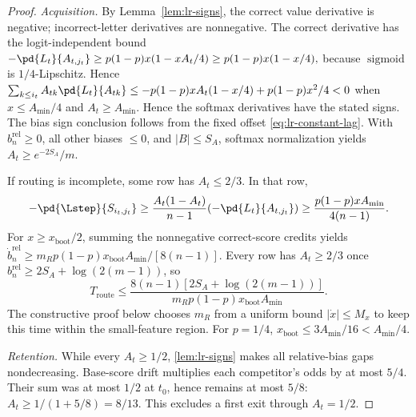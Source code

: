 \begin{proof}
\emph{Acquisition.} By Lemma~\ref{lem:lr-signs}, the correct value derivative is negative;
incorrect-letter derivatives are nonnegative.  The correct derivative has the logit-independent bound
 $-\pd{L_t}{A_{t,j_t}}\ge p(1-p) x(1-xA_t/4)\ge p(1-p) x(1-x/4),$ 
because $\operatorname{sigmoid}$ is $1/4$-Lipschitz. Hence
 $\sum_{k\le i_t}A_{tk}\pd{L_t}{A_{tk}}\le-p(1-p) x A_t(1-x/4)+p(1-p) x^2/4<0$ 
when $x\le A_{\min}/4$ and $A_t\ge A_{\min}$.  Hence the softmax derivatives have the stated signs.
The bias sign conclusion follows from the fixed offset
\eqref{eq:lr-constant-lag}.
With $b_n^{\mathrm{rel}}\ge0$, all other biases $\le0$,
and $|B|\le S_A$, softmax normalization yields
$A_t\ge e^{-2S_A}/m$.

If routing is incomplete, some row has $A_t\le2/3$. In that row,
\[
 -\pd{\Lstep}{S_{i_t,j_t}}
 \ge\frac{A_t(1-A_t)}{n-1}(-\pd{L_t}{A_{t,j_t}})
 \ge\frac{p(1-p)xA_{\min}}{4(n-1)}.
\]
For $x\ge x_{\mathrm{boot}}/2$, summing the nonnegative correct-score
credits yields $\dot b_n^{\mathrm{rel}}\ge
m_Rp(1-p)x_{\mathrm{boot}}A_{\min}/[8(n-1)]$.
Every row has $A_t\ge2/3$ once
$b_n^{\mathrm{rel}}\ge2S_A+\log(2(m-1))$, so
\[
 T_{\mathrm{route}}\le
 \frac{8(n-1)[2S_A+\log(2(m-1))]}{m_Rp(1-p)x_{\mathrm{boot}}A_{\min}}.
\]
The constructive proof below chooses $m_R$ from a uniform bound
$|\dot x|\le M_x$ to keep this time within the small-feature region.
For $p=1/4$, $x_{\mathrm{boot}}\le3A_{\min}/16<A_{\min}/4$.

\emph{Retention.} While every $A_t\ge1/2$, \cref{lem:lr-signs} makes
all relative-bias gaps nondecreasing. Base-score drift multiplies each
competitor's odds by at most $5/4$. Their sum was at most $1/2$ at $t_0$,
hence remains at most $5/8$: $A_t\ge1/(1+5/8)=8/13$.
This excludes a first exit through $A_t=1/2$.
\end{proof}

